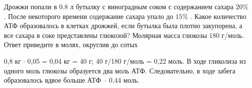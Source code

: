
Дрожжи попали в 0.8 л бутылку с виноградным соком с
содержанием сахара $20\%$ . После некоторого времени содержание сахара упало до
$15\%$ . Какое количество АТФ образовалось в клетках дрожжей, если бутылка была
плотно закупорена, а все сахара в соке представлены глюкозой?  Молярная масса глюкозы $180$  г/моль. Ответ
приведите в молях, округлив до сотых

\solutionSection

0,8 кг $\cdot$ 0,05 = 0,04 кг = 40 г; 40 г/180 г/моль = 0,22 моль. В ходе гликолиза из одного моль глюкозы образуется два моль АТФ. Следовательно, в ходе забега образовалось вдвое больше АТФ – 0,44 моль.

